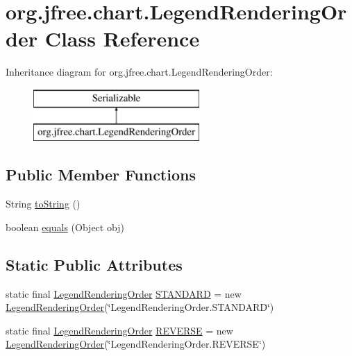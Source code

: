 \hypertarget{classorg_1_1jfree_1_1chart_1_1_legend_rendering_order}{}\section{org.\+jfree.\+chart.\+Legend\+Rendering\+Order Class Reference}
\label{classorg_1_1jfree_1_1chart_1_1_legend_rendering_order}
Inheritance diagram for org.\+jfree.\+chart.\+Legend\+Rendering\+Order\+:\begin{figure}[H]
\begin{center}
\leavevmode
\includegraphics[height=2.000000cm]{classorg_1_1jfree_1_1chart_1_1_legend_rendering_order}
\end{center}
\end{figure}
\subsection*{Public Member Functions}
\begin{DoxyCompactItemize}
\item 
String \mbox{\hyperlink{classorg_1_1jfree_1_1chart_1_1_legend_rendering_order_a68ae725fd53deff6ae4216abcd617b65}{to\+String}} ()
\item 
boolean \mbox{\hyperlink{classorg_1_1jfree_1_1chart_1_1_legend_rendering_order_aba2edfd66e02030760e46bc259af86d0}{equals}} (Object obj)
\end{DoxyCompactItemize}
\subsection*{Static Public Attributes}
\begin{DoxyCompactItemize}
\item 
static final \mbox{\hyperlink{classorg_1_1jfree_1_1chart_1_1_legend_rendering_order}{Legend\+Rendering\+Order}} \mbox{\hyperlink{classorg_1_1jfree_1_1chart_1_1_legend_rendering_order_afbcbadfb4e3205c9d4229b623bf95c79}{S\+T\+A\+N\+D\+A\+RD}} = new \mbox{\hyperlink{classorg_1_1jfree_1_1chart_1_1_legend_rendering_order}{Legend\+Rendering\+Order}}(\char`\"{}Legend\+Rendering\+Order.\+S\+T\+A\+N\+D\+A\+RD\char`\"{})
\item 
static final \mbox{\hyperlink{classorg_1_1jfree_1_1chart_1_1_legend_rendering_order}{Legend\+Rendering\+Order}} \mbox{\hyperlink{classorg_1_1jfree_1_1chart_1_1_legend_rendering_order_a54437266354fca7530f9816fb8e13969}{R\+E\+V\+E\+R\+SE}} = new \mbox{\hyperlink{classorg_1_1jfree_1_1chart_1_1_legend_rendering_order}{Legend\+Rendering\+Order}}(\char`\"{}Legend\+Rendering\+Order.\+R\+E\+V\+E\+R\+SE\char`\"{})
\end{DoxyCompactItemize}


